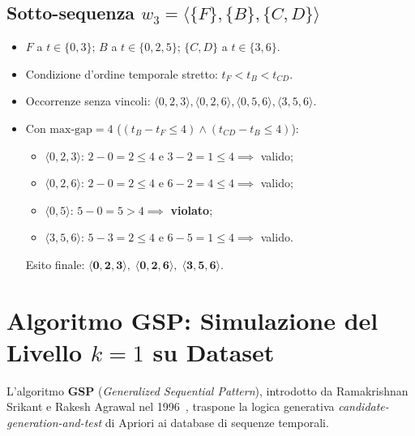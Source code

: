 \FloatBarrier
\subsection{Sotto-sequenza \texorpdfstring{$w_3 = \langle \{F\}, \{B\}, \{C, D\} \rangle$}{w3}}
\begin{itemize}
    \item $F$ a $t \in \{0, 3\}$; $B$ a $t \in \{0, 2, 5\}$; $\{C, D\}$ a $t \in \{3, 6\}$.
    \item Condizione d'ordine temporale stretto: $t_F < t_B < t_{CD}$.
    \item Occorrenze senza vincoli: $\langle 0, 2, 3 \rangle, \langle 0, 2, 6 \rangle, \langle 0, 5, 6 \rangle, \langle 3, 5, 6 \rangle$.
    \item Con $\text{max-gap} = 4$ ($(t_B - t_F \le 4) \land (t_{CD} - t_B \le 4)$):
    \begin{itemize}
        \item $\langle 0, 2, 3 \rangle$: $2 - 0 = 2 \le 4$ e $3 - 2 = 1 \le 4 \implies$ valido;
        \item $\langle 0, 2, 6 \rangle$: $2 - 0 = 2 \le 4$ e $6 - 2 = 4 \le 4 \implies$ valido;
        \item $\langle 0, 5 \rangle$: $5 - 0 = 5 > 4 \implies$ \textbf{violato};
        \item $\langle 3, 5, 6 \rangle$: $5 - 3 = 2 \le 4$ e $6 - 5 = 1 \le 4 \implies$ valido.
    \end{itemize}
    Esito finale: $\mathbf{\langle 0, 2, 3 \rangle, \; \langle 0, 2, 6 \rangle, \; \langle 3, 5, 6 \rangle}$.
\end{itemize}

\FloatBarrier
\section{Algoritmo GSP: Simulazione del Livello \texorpdfstring{$k=1$}{k=1} su Dataset}
\label{sec:dm-gsp-simulation-l1}

L'algoritmo \textbf{GSP} (\textit{Generalized Sequential Pattern}), introdotto da Ramakrishnan Srikant e Rakesh Agrawal nel 1996~\cite{srikant1996}, traspone la logica generativa \textit{candidate-generation-and-test} di Apriori ai database di sequenze temporali.

